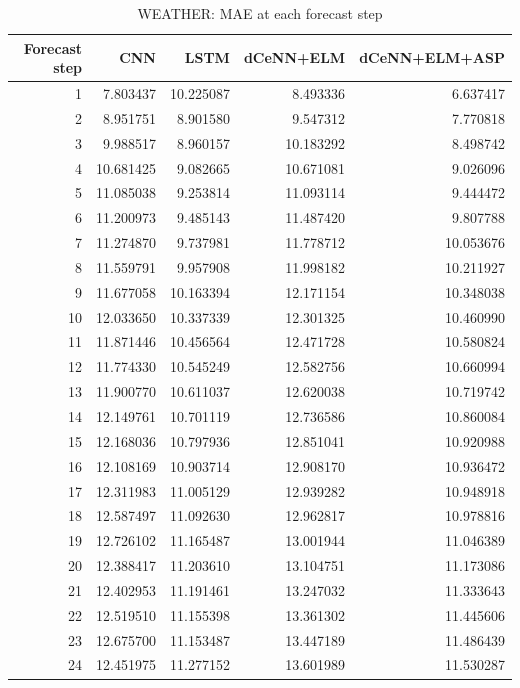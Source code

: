 \begin{table}
\caption{WEATHER: MAE at each forecast step}
\begin{tabular}{rrrrr}
\toprule
Forecast step & CNN & LSTM & dCeNN+ELM & dCeNN+ELM+ASP \\
\midrule
1 & 7.803437 & 10.225087 & 8.493336 & 6.637417 \\
2 & 8.951751 & 8.901580 & 9.547312 & 7.770818 \\
3 & 9.988517 & 8.960157 & 10.183292 & 8.498742 \\
4 & 10.681425 & 9.082665 & 10.671081 & 9.026096 \\
5 & 11.085038 & 9.253814 & 11.093114 & 9.444472 \\
6 & 11.200973 & 9.485143 & 11.487420 & 9.807788 \\
7 & 11.274870 & 9.737981 & 11.778712 & 10.053676 \\
8 & 11.559791 & 9.957908 & 11.998182 & 10.211927 \\
9 & 11.677058 & 10.163394 & 12.171154 & 10.348038 \\
10 & 12.033650 & 10.337339 & 12.301325 & 10.460990 \\
11 & 11.871446 & 10.456564 & 12.471728 & 10.580824 \\
12 & 11.774330 & 10.545249 & 12.582756 & 10.660994 \\
13 & 11.900770 & 10.611037 & 12.620038 & 10.719742 \\
14 & 12.149761 & 10.701119 & 12.736586 & 10.860084 \\
15 & 12.168036 & 10.797936 & 12.851041 & 10.920988 \\
16 & 12.108169 & 10.903714 & 12.908170 & 10.936472 \\
17 & 12.311983 & 11.005129 & 12.939282 & 10.948918 \\
18 & 12.587497 & 11.092630 & 12.962817 & 10.978816 \\
19 & 12.726102 & 11.165487 & 13.001944 & 11.046389 \\
20 & 12.388417 & 11.203610 & 13.104751 & 11.173086 \\
21 & 12.402953 & 11.191461 & 13.247032 & 11.333643 \\
22 & 12.519510 & 11.155398 & 13.361302 & 11.445606 \\
23 & 12.675700 & 11.153487 & 13.447189 & 11.486439 \\
24 & 12.451975 & 11.277152 & 13.601989 & 11.530287 \\
\bottomrule
\end{tabular}
\end{table}
